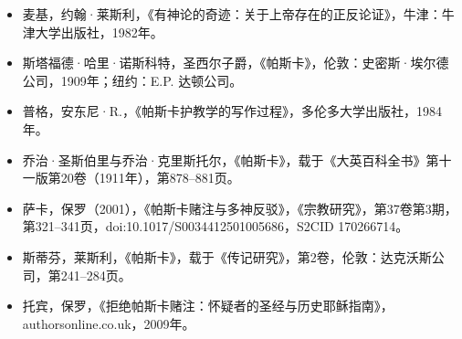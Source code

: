 \begin{itemize}
\item 麦基，约翰·莱斯利，《有神论的奇迹：关于上帝存在的正反论证》，牛津：牛津大学出版社，1982年。
\item 斯塔福德·哈里·诺斯科特，圣西尔子爵，《帕斯卡》，伦敦：史密斯·埃尔德公司，1909年；纽约：E.P. 达顿公司。
\item 普格，安东尼·R.，《帕斯卡护教学的写作过程》，多伦多大学出版社，1984年。
\item 乔治·圣斯伯里与乔治·克里斯托尔，《帕斯卡》，载于《大英百科全书》第十一版第20卷（1911年），第878–881页。
\item 萨卡，保罗（2001），《帕斯卡赌注与多神反驳》，《宗教研究》，第37卷第3期，第321–341页，doi:10.1017/S0034412501005686，S2CID 170266714。
\item 斯蒂芬，莱斯利，《帕斯卡》，载于《传记研究》，第2卷，伦敦：达克沃斯公司，第241–284页。
\item 托宾，保罗，《拒绝帕斯卡赌注：怀疑者的圣经与历史耶稣指南》，authorsonline.co.uk，2009年。
\end{itemize}
